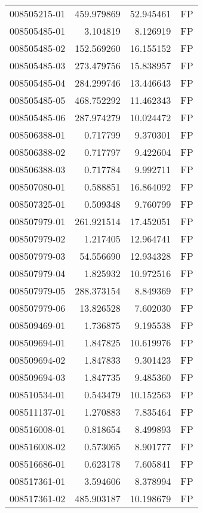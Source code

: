 \begin{tabular}{lrrl}
008505215-01 &  459.979869 &    52.945461 &   FP \\
008505485-01 &    3.104819 &     8.126919 &   FP \\
008505485-02 &  152.569260 &    16.155152 &   FP \\
008505485-03 &  273.479756 &    15.838957 &   FP \\
008505485-04 &  284.299746 &    13.446643 &   FP \\
008505485-05 &  468.752292 &    11.462343 &   FP \\
008505485-06 &  287.974279 &    10.024472 &   FP \\
008506388-01 &    0.717799 &     9.370301 &   FP \\
008506388-02 &    0.717797 &     9.422604 &   FP \\
008506388-03 &    0.717784 &     9.992711 &   FP \\
008507080-01 &    0.588851 &    16.864092 &   FP \\
008507325-01 &    0.509348 &     9.760799 &   FP \\
008507979-01 &  261.921514 &    17.452051 &   FP \\
008507979-02 &    1.217405 &    12.964741 &   FP \\
008507979-03 &   54.556690 &    12.934328 &   FP \\
008507979-04 &    1.825932 &    10.972516 &   FP \\
008507979-05 &  288.373154 &     8.849369 &   FP \\
008507979-06 &   13.826528 &     7.602030 &   FP \\
008509469-01 &    1.736875 &     9.195538 &   FP \\
008509694-01 &    1.847825 &    10.619976 &   FP \\
008509694-02 &    1.847833 &     9.301423 &   FP \\
008509694-03 &    1.847735 &     9.485360 &   FP \\
008510534-01 &    0.543479 &    10.152563 &   FP \\
008511137-01 &    1.270883 &     7.835464 &   FP \\
008516008-01 &    0.818654 &     8.499893 &   FP \\
008516008-02 &    0.573065 &     8.901777 &   FP \\
008516686-01 &    0.623178 &     7.605841 &   FP \\
008517361-01 &    3.594606 &     8.378994 &   FP \\
008517361-02 &  485.903187 &    10.198679 &   FP \\

\end{tabular}
